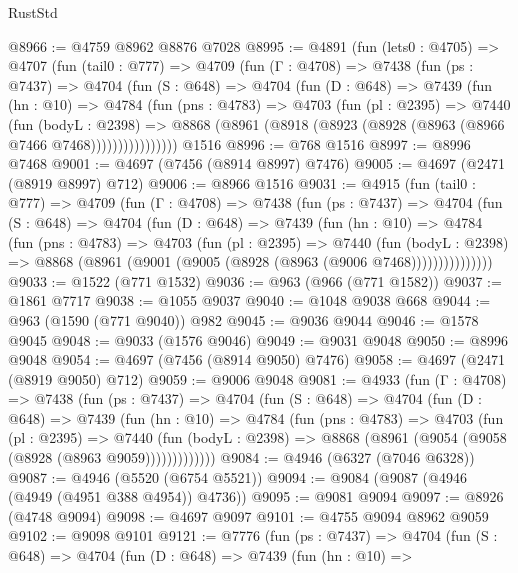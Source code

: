 \begin{lexlean}{RustStd}
\begin{coremodule}
@8966 := @4759 @8962 @8876 @7028
@8995 := @4891
    (fun (lets0 : @4705) =>
    @4707
      (fun (tail0 : @777) =>
      @4709
        (fun (Γ : @4708) =>
        @7438
          (fun (ps : @7437) =>
          @4704
            (fun (S : @648) =>
            @4704
              (fun (D : @648) =>
              @7439
                (fun (hn : @10) =>
                @4784
                  (fun (pns : @4783) =>
                  @4703
                    (fun (pl : @2395) =>
                    @7440
                      (fun (bodyL : @2398) =>
                      @8868 (@8961 (@8918 (@8923 (@8928 (@8963 (@8966 @7466 @7468))))))))))))))))
    @1516
@8996 := @768 @1516
@8997 := @8996 @7468
@9001 := @4697 (@7456 (@8914 @8997) @7476)
@9005 := @4697 (@2471 (@8919 @8997) @712)
@9006 := @8966 @1516
@9031 := @4915
    (fun (tail0 : @777) =>
    @4709
      (fun (Γ : @4708) =>
      @7438
        (fun (ps : @7437) =>
        @4704
          (fun (S : @648) =>
          @4704
            (fun (D : @648) =>
            @7439
              (fun (hn : @10) =>
              @4784
                (fun (pns : @4783) =>
                @4703
                  (fun (pl : @2395) =>
                  @7440
                    (fun (bodyL : @2398) =>
                    @8868 (@8961 (@9001 (@9005 (@8928 (@8963 (@9006 @7468)))))))))))))))
@9033 := @1522 (@771 @1532)
@9036 := @963 (@966 (@771 @1582))
@9037 := @1861 @7717
@9038 := @1055 @9037
@9040 := @1048 @9038 @668
@9044 := @963 (@1590 (@771 @9040)) @982
@9045 := @9036 @9044
@9046 := @1578 @9045
@9048 := @9033 (@1576 @9046)
@9049 := @9031 @9048
@9050 := @8996 @9048
@9054 := @4697 (@7456 (@8914 @9050) @7476)
@9058 := @4697 (@2471 (@8919 @9050) @712)
@9059 := @9006 @9048
@9081 := @4933
    (fun (Γ : @4708) =>
    @7438
      (fun (ps : @7437) =>
      @4704
        (fun (S : @648) =>
        @4704
          (fun (D : @648) =>
          @7439
            (fun (hn : @10) =>
            @4784
              (fun (pns : @4783) =>
              @4703
                (fun (pl : @2395) =>
                @7440
                  (fun (bodyL : @2398) =>
                  @8868 (@8961 (@9054 (@9058 (@8928 (@8963 @9059)))))))))))))
@9084 := @4946 (@6327 (@7046 @6328))
@9087 := @4946 (@5520 (@6754 @5521))
@9094 := @9084 (@9087 (@4946 (@4949 (@4951 @388 @4954)) @4736))
@9095 := @9081 @9094
@9097 := @8926 (@4748 @9094)
@9098 := @4697 @9097
@9101 := @4755 @9094 @8962 @9059
@9102 := @9098 @9101
@9121 := @7776
    (fun (ps : @7437) =>
    @4704
      (fun (S : @648) =>
      @4704
        (fun (D : @648) =>
        @7439
          (fun (hn : @10) =>

\end{coremodule}
\end{lexlean}
